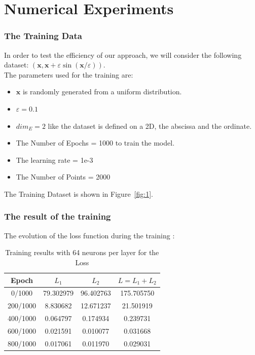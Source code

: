 \documentclass{beamer}
\begin{document}
    \section{Numerical Experiments}
    \begin{frame}{}
        \frametitle{The Training Data}
        In order to test the efficiency of our approach, we will consider the following dataset:
        $(\mathbf{x}, \mathbf{x}+\varepsilon \sin (\mathbf{x} / \varepsilon))$.
            \\
            The parameters used for the training are:
            \begin{itemize}
                \item $\mathbf{x}$ is randomly generated from a uniform distribution.
                \item $\varepsilon = 0.1$
                \item  $dim_E = 2$ like the dataset is defined on a 2D,
                the abscissa and the ordinate.
                \item The Number of Epochs = 1000  to train the model.
                \item The learning rate = 1e-3
                \item The Number of Points = 2000
            \end{itemize}

            The Training Dataset is shown in Figure~\ref{fig:1}.
    \end{frame}
    \begin{frame}
        \frametitle{The result of the training}
        The evolution of the loss function during the training : 
        \begin{table}[h]
            \centering
            \begin{tabular}{|c|c|c|c|}
            \hline
            Epoch & $L_{1}$ & $L_{2}$ & $L = L_{1} + L_{2}$ \\
            \hline
            0/1000 & 79.302979 & 96.402763 & 175.705750 \\
            200/1000 & 8.830682 & 12.671237 & 21.501919 \\
            400/1000 & 0.064797 & 0.174934 & 0.239731 \\
            600/1000 & 0.021591 & 0.010077 & 0.031668 \\
            800/1000 & 0.017061 & 0.011970 & 0.029031 \\
            \hline
            \end{tabular}
            \caption{Training results with 64 neurons per layer for the Loss}
        \end{table}
    \end{frame}
\end{document}
